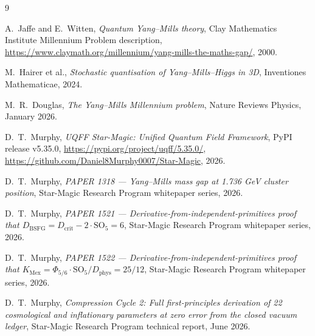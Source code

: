 \documentclass[11pt,a4paper,onecolumn]{article}
\theoremstyle{plain}
\theoremstyle{definition}
\theoremstyle{remark}
\begin{document}
\begin{thebibliography}{9}

A.~Jaffe and E.~Witten,
\textit{Quantum Yang--Mills theory},
Clay Mathematics Institute Millennium Problem description,
\url{https://www.claymath.org/millennium/yang-mills-the-maths-gap/},
2000.

M.~Hairer et al.,
\textit{Stochastic quantisation of Yang--Mills--Higgs in 3D},
Inventiones Mathematicae, 2024.

M.~R.~Douglas,
\textit{The Yang--Mills Millennium problem},
Nature Reviews Physics, January 2026.

D.~T.~Murphy,
\textit{UQFF Star-Magic: Unified Quantum Field Framework},
PyPI release v5.35.0,
\url{https://pypi.org/project/uqff/5.35.0/},
\url{https://github.com/Daniel8Murphy0007/Star-Magic},
2026.

D.~T.~Murphy,
\textit{PAPER 1318 --- Yang--Mills mass gap at 1.736 GeV cluster
position},
Star-Magic Research Program whitepaper series, 2026.

D.~T.~Murphy,
\textit{PAPER 1521 --- Derivative-from-independent-primitives proof
that $D_{\mathrm{BSFG}} = D_{\mathrm{crit}} - 2 \cdot \mathrm{SO}_5 = 6$},
Star-Magic Research Program whitepaper series, 2026.

D.~T.~Murphy,
\textit{PAPER 1522 --- Derivative-from-independent-primitives proof
that $K_{\mathrm{Mex}} = \Phi_{5/6} \cdot \mathrm{SO}_5 / D_{\mathrm{phys}} = 25/12$},
Star-Magic Research Program whitepaper series, 2026.

D.~T.~Murphy,
\textit{Compression Cycle 2: Full first-principles derivation of 22
cosmological and inflationary parameters at zero error from the closed
vacuum ledger},
Star-Magic Research Program technical report, June 2026.

\end{thebibliography}
\end{document}

